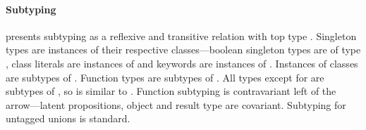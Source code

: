 %
%
%
%


\paragraph{Subtyping}
 presents subtyping
as a reflexive and transitive relation with top type \Top. 
Singleton types are instances of their respective classes---boolean singleton types
are of type \Boolean{}, class literals are instances of \Class{} and keywords are
instances of \Keyword{}.
Instances of classes \class{} are subtypes of \Object{}. Function types 
are subtypes of \IFn{}. All types except for \Nil{} are subtypes of \Object{},
so \Top{} is similar to {\Union{\Nil}{\Object}}.
Function subtyping is contravariant left of the arrow---latent propositions, object
and result type are covariant.
Subtyping for untagged unions is standard.

